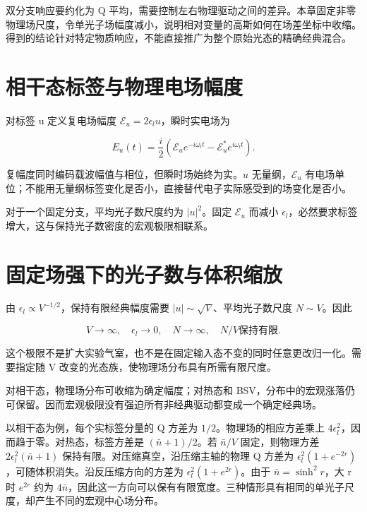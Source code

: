 \documentclass[UTF8,a4paper,zihao=-4,openany,fontset=fandol]{ctexbook}
\begin{document}
双分支响应要约化为 Q 平均，需要控制左右物理驱动之间的差异。本章固定非零物理场尺度，令单光子场幅度减小，说明相对变量的高斯如何在场差坐标中收缩。得到的结论针对特定物质响应，不能直接推广为整个原始光态的精确经典混合。



\section{相干态标签与物理电场幅度}\label{sec:12:1}


对标签 u 定义复电场幅度 $\mathcal E_u=2\epsilon_lu$，瞬时实电场为



\begin{equation*}
E_u(t)=\frac i2\left(\mathcal E_ue^{-i\omega_lt}
-\mathcal E_u^*e^{i\omega_lt}\right).
\tag{12.1}\label{eq:12.1}
\end{equation*}


复幅度同时编码载波幅值与相位，但瞬时场始终为实。$u$ 无量纲，$\mathcal E_u$ 有电场单位；不能用无量纲标签变化是否小，直接替代电子实际感受到的场变化是否小。



对于一个固定分支，平均光子数尺度约为 $|u|^2$。固定 $\mathcal E_u$ 而减小 $\epsilon_l$，必然要求标签增大，这与保持光子数密度的宏观极限相联系。



\section{固定场强下的光子数与体积缩放}\label{sec:12:2}


由 $\epsilon_l\propto V^{-1/2}$，保持有限经典幅度需要 $|u|\sim\sqrt V$、平均光子数尺度 $N\sim V$。因此



\begin{equation*}
V\to\infty,\quad \epsilon_l\to0,\quad
N\to\infty,\quad N/V\text{保持有限}.
\tag{12.2}\label{eq:12.2}
\end{equation*}


这个极限不是扩大实验气室，也不是在固定输入态不变的同时任意更改归一化。需要指定随 V 改变的光态族，使物理场分布具有所需有限尺度。



对相干态，物理场分布可收缩为确定幅度；对热态和 BSV，分布中的宏观涨落仍可保留。因而宏观极限没有强迫所有非经典驱动都变成一个确定经典场。



以相干态为例，每个实标签分量的 Q 方差为 $1/2$。物理场的相应方差乘上 $4\epsilon_l^2$，因而趋于零。对热态，标签方差是 $(\bar n+1)/2$。若 $\bar n/V$ 固定，则物理方差 $2\epsilon_l^2(\bar n+1)$ 保持有限。对压缩真空，沿压缩主轴的物理 Q 方差为 $\epsilon_l^2(1+e^{-2r})$，可随体积消失。沿反压缩方向的方差为 $\epsilon_l^2(1+e^{2r})$。由于 $\bar n=\sinh^2 r$，大 r 时 $e^{2r}$ 约为 $4\bar n$，因此这一方向可以保有有限宽度。三种情形具有相同的单光子尺度，却产生不同的宏观中心场分布。
\end{document}
